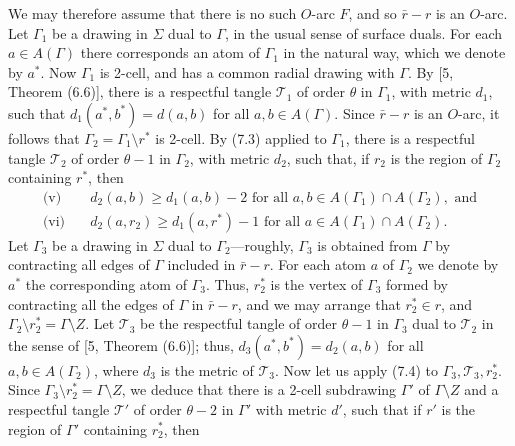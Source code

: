 We may therefore assume that there is no such $O$-arc $F$, and so $\bar{r} - r$ is an $O$-arc. Let $\Gamma_1$ be a drawing in $\Sigma$ dual to $\Gamma$, in the usual sense of surface duals. For each $a \in A(\Gamma)$ there corresponds an atom of $\Gamma_1$ in the natural way, which we denote by $a^*$. Now $\Gamma_1$ is 2-cell, and has a common radial drawing with $\Gamma$. By [5, Theorem (6.6)], there is a respectful tangle $\mathscr{T}_1$ of order $\theta$ in $\Gamma_1$, with metric $d_1$, such that $d_1(a^*, b^*) = d(a, b)$ for all $a, b \in A(\Gamma)$. Since $\bar{r} - r$ is an $O$-arc, it follows that $\Gamma_2 = \Gamma_1 \setminus r^*$ is 2-cell. By (7.3) applied to $\Gamma_1$, there is a respectful tangle $\mathscr{T}_2$ of order $\theta - 1$ in $\Gamma_2$, with metric $d_2$, such that, if $r_2$ is the region of $\Gamma_2$ containing $r^*$, then
\begin{align*}
\text{(v)} \quad & d_2(a, b) \ge d_1(a, b) - 2 \text{ for all } a, b \in A(\Gamma_1) \cap A(\Gamma_2), \text{ and} \\
\text{(vi)} \quad & d_2(a, r_2) \ge d_1(a, r^*) - 1 \text{ for all } a \in A(\Gamma_1) \cap A(\Gamma_2).
\end{align*}
Let $\Gamma_3$ be a drawing in $\Sigma$ dual to $\Gamma_2$---roughly, $\Gamma_3$ is obtained from $\Gamma$ by contracting all edges of $\Gamma$ included in $\bar{r} - r$. For each atom $a$ of $\Gamma_2$ we denote by $a^*$ the corresponding atom of $\Gamma_3$. Thus, $r_2^*$ is the vertex of $\Gamma_3$ formed by contracting all the edges of $\Gamma$ in $\bar{r} - r$, and we may arrange that $r_2^* \in r$, and $\Gamma_2 \setminus r_2^* = \Gamma \setminus Z$. Let $\mathscr{T}_3$ be the respectful tangle of order $\theta - 1$ in $\Gamma_3$ dual to $\mathscr{T}_2$ in the sense of [5, Theorem (6.6)]; thus, $d_3(a^*, b^*) = d_2(a, b)$ for all $a, b \in A(\Gamma_2)$, where $d_3$ is the metric of $\mathscr{T}_3$. Now let us apply (7.4) to $\Gamma_3, \mathscr{T}_3, r_2^*$. Since $\Gamma_3 \setminus r_2^* = \Gamma \setminus Z$, we deduce that there is a 2-cell subdrawing $\Gamma'$ of $\Gamma \setminus Z$ and a respectful tangle $\mathscr{T}'$ of order $\theta - 2$ in $\Gamma'$ with metric $d'$, such that if $r'$ is the region of $\Gamma'$ containing $r_2^*$, then
